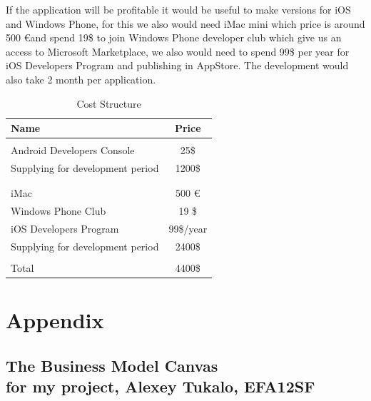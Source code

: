 \documentclass[english]{article}
\begin{document}
If the application will be profitable it would be useful to make versions for iOS and Windows Phone, for this we also would need iMac mini which price is around 500 \euro and spend 19\$ to join Windows Phone developer club which give us an access to Microsoft Marketplace, we also would need to spend 99\$ per year for iOS Developers Program and publishing in AppStore. The development would also take 2 month per application.

\begin{table}[h]
 \begin{center}
  \caption{Cost Structure}
    \begin{tabular}{ l c }    
    	\hline    	
  	  Name & Price  \\ \hline \\
  	   Android Developers Console & 25\$ \\ 
  	   Supplying for development period & 1200\$ \\ \\\hline\\
  	   iMac & 500 \euro \\
  	   Windows Phone Club & 19 \$ \\
  	   iOS Developers Program & 99\$/year  
  	   \\ Supplying for development period & 2400\$ \\
  	   \\  \hline  
  	  
  	   Total &  4400\$\\
  	  	  \hline
    \end{tabular}
 \end{center}
\end{table}


\newpage
\section{Appendix}
\subsection{The Business Model Canvas\\
\small for my project, Alexey Tukalo, EFA12SF}
\end{document}
